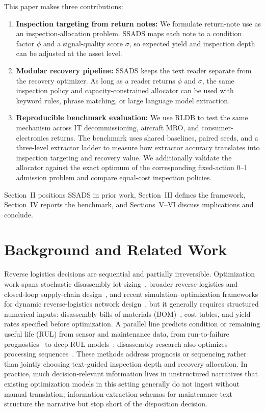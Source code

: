 \documentclass[a4paper,conference]{IEEEtran}
\begin{document}
This paper makes three contributions:
\begin{enumerate}[noitemsep]
\item \textbf{Inspection targeting from return notes:} We formulate return-note use
  as an inspection-allocation problem. SSADS maps each note to a condition factor
  $\phi$ and a signal-quality score
  $\sigma$, so expected yield and inspection depth can be adjusted at the asset
  level.

\item \textbf{Modular recovery pipeline:} SSADS keeps the text reader separate
  from the recovery optimizer. As long as a reader returns $\phi$ and $\sigma$,
  the same inspection policy and capacity-constrained allocator can be used with
  keyword rules, phrase matching, or large language model extraction.

\item \textbf{Reproducible benchmark evaluation:} We use RLDB to test the same mechanism across IT
  decommissioning, aircraft MRO, and consumer-electronics
  returns. The benchmark uses shared baselines, paired seeds, and a three-level
  extractor ladder to measure how extractor accuracy translates into inspection
  targeting and recovery value. We additionally validate the allocator against the
  exact optimum of the corresponding fixed-action 0--1 admission problem and
  compare equal-cost inspection policies.
\end{enumerate}

Section~II positions SSADS in prior work, Section~III defines the framework,
Section~IV reports the benchmark, and Sections~V--VI discuss implications and
conclude.

\section{Background and Related Work}

Reverse logistics decisions are sequential and partially irreversible.
Optimization work spans stochastic disassembly lot-sizing~\cite{Slama2022},
broader reverse-logistics and closed-loop supply-chain design~\cite{Govindan2015},
and recent simulation--optimization frameworks for dynamic reverse-logistics
network design~\cite{Sun2024},
but it generally requires structured numerical inputs: disassembly bills of materials
(BOM)~\cite{Babbitt2020}, cost tables, and yield rates specified before optimization.
A parallel line predicts condition or remaining useful life (RUL) from sensor and
maintenance data, from run-to-failure prognostics~\cite{Saxena2008} to deep RUL
models~\cite{Zhang2017}; disassembly research also optimizes processing
sequences~\cite{Fan2023}. These methods address prognosis or sequencing rather than
jointly choosing text-guided inspection depth and recovery allocation. In practice,
much decision-relevant information lives in unstructured narratives
that existing optimization models in this setting generally do not ingest without
manual translation; information-extraction schemas for maintenance text~\cite{Bikaun2024}
structure the narrative but stop short of the disposition decision.
\end{document}
